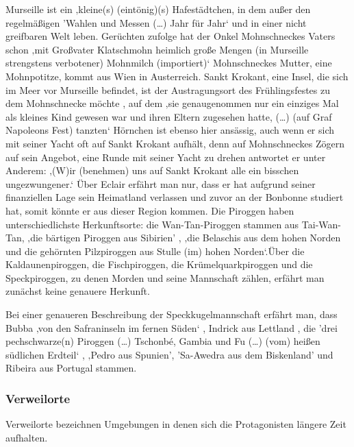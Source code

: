 {Murseille ist ein ‚kleine(s) (eintönig)(s) Hafestädtchen, in dem außer den regelmäßigen 'Wahlen und Messen (…) Jahr für Jahr‘ \cite[S. 10[{pir} nichts außergewöhnliches passiert. Die Bewohner leben sicher ‚in häuslicher Geborgenheit‘ und erzählen sich höchstens Gruselgeschichten von ‚wilden Piroggenpiraten, (die als) etwas Fernes und Sagenhaftes (gelten)‘ \cite[S.10]{pir} und in einer nicht greifbaren Welt leben. Gerüchten zufolge hat der Onkel Mohnschneckes Vaters schon ‚mit Großvater Klatschmohn heimlich große Mengen (in Murseille strengstens verbotener) Mohnmilch (importiert)‘\cite[S.14]{pir} Mohnschneckes Mutter, eine Mohnpotitze, kommt aus Wien in Austerreich. \cite[S. 13]{pir} Sankt Krokant, eine Insel, die sich im Meer vor Murseille befindet, ist der Austragungsort des Frühlingsfestes zu dem Mohnschnecke möchte \cite[S.17]{pir}, auf dem ‚sie genaugenommen nur ein einziges Mal als kleines Kind gewesen war und ihren Eltern zugesehen hatte, (…) (auf Graf Napoleons Fest) tanzten‘ \cite[S.521]{pir} 
Hörnchen ist ebenso hier ansässig, auch wenn er sich mit seiner Yacht oft auf Sankt Krokant aufhält, denn auf Mohnschneckes Zögern auf sein Angebot, eine Runde mit seiner Yacht zu drehen antwortet er unter Anderem: ‚(W)ir (benehmen) uns auf Sankt Krokant alle ein bisschen ungezwungener.‘\cite[S.25]{pir} 
Über Eclair erfährt man nur, dass er hat aufgrund seiner finanziellen Lage sein Heimatland verlassen und zuvor an der Bonbonne studiert hat, somit könnte er aus dieser Region kommen. \cite[S.15f]{pir}
Die Piroggen haben unterschiedlichste Herkunftsorte: die Wan-Tan-Piroggen stammen aus Tai-Wan-Tan, \cite[S.8]{pir}
 ‚die bärtigen Piroggen aus Sibirien' \cite[S.8]{pir}, ‚die Belaschis aus dem hohen Norden \cite[S.9]{pir} und die gehörnten Pilzpiroggen aus Stulle (im) hohen Norden‘\cite[S.9]{pir}.Über die Kaldaunenpiroggen, die Fischpiroggen, die Krümelquarkpiroggen und die Speckpiroggen, zu denen Morden und seine Mannschaft zählen, erfährt man zunächst keine genauere Herkunft. \cite[S.9f]{pir}

Bei einer genaueren Beschreibung der Speckkugelmannschaft erfährt man, dass Bubba ‚von den Safraninseln im fernen Süden‘ \cite[S.46]{pir}, Indrick aus Lettland \cite[S.46f]{pir}, die 'drei pechschwarze(n) Piroggen (…) Tschonbé, Gambia und Fu (…) (vom) heißen südlichen Erdteil‘ \cite[S.47]{pir}, ‚Pedro aus Spunien'\cite[S.47]{pir}, 'Sa-Awedra aus dem Biskenland' \cite[S.47]{pir} und Ribeira aus Portugal \cite[S.47]{pir} stammen.


\subsubsection{Verweilorte}
Verweilorte bezeichnen Umgebungen in denen sich die Protagonisten längere Zeit aufhalten.

}
